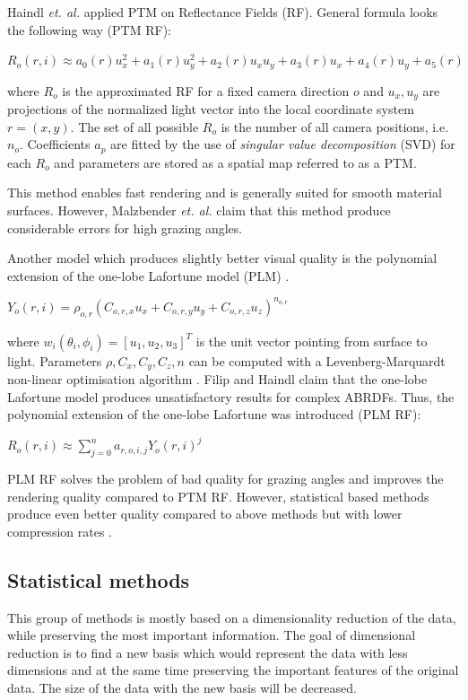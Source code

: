 Haindl  \emph{et. al.} \cite{haindl} applied PTM on Reflectance Fields (RF).
General formula looks the following way (PTM RF):

{\centering$R_{o}(r,i)\approx a_{0}(r)u_{x}^2+a_{1}(r)u_{y}^2+a_{2}(r)u_{x}u_{y}+a_{3}(r)u_{x}+a_{4}(r)u_{y}+a_{5}(r)$\\}

 where $R_{o}$ is the approximated RF for a fixed camera direction $o$ and $u_{x},u_{y}$ are projections of the normalized light vector into the local coordinate system $r=(x,y)$.
 The set of all possible $R_{o}$ is the number of all camera positions, i.e. $n_{o}$. 
 Coefficients $a_{p}$ are fitted by the use of \emph{singular value decomposition} (SVD) for each $R_{o}$ and parameters are stored as a spatial map referred to as a PTM.
 
  This method enables fast rendering and is generally suited for smooth material surfaces.
  However, Malzbender  \emph{et. al.} \cite{PTM} claim that this method produce considerable errors for high grazing angles. 

 
 Another model which produces slightly better visual quality is the polynomial extension of the one-lobe Lafortune model (PLM) \cite{haindl}.


{\centering$Y_{o} (r,i) = \rho_{o,r}(C_{o,r,x}u_{x}+C_{o,r,y}u_{y}+C_{o,r,z}u_{z})_{ }^{n_{o,r}}$\\}

where $w_{i}(\theta_{i}, \phi_{i})=[u_{1},u_{2},u_{3}]^{T}$ is the unit vector pointing from surface to light.
Parameters $\rho,C_{x},C_{y},C_{z},n$ can be computed with a Levenberg-Marquardt non-linear optimisation algorithm \cite{plm}. 
 Filip and Haindl \cite{plm} claim that the one-lobe Lafortune model produces unsatisfactory results for complex ABRDFs.
 Thus, the polynomial extension of the one-lobe Lafortune was introduced (PLM RF):

{\centering$R_{o}(r,i)\approx  \sum_{j=0}^{n} a_{r,o,i,j}Y_{o}(r,i)^j$\\}



PLM RF solves the problem of bad quality for grazing angles and improves the rendering quality compared to PTM RF.
However, statistical based methods produce even better quality compared to above methods but with lower compression rates \cite{haindl}.



  \subsection{Statistical methods}
\label{section:stat_methods}
This group of methods is mostly based on a dimensionality reduction of the data, while preserving the most important information.
The goal of dimensional reduction is to find a new basis which would represent the data with less dimensions and at the same time preserving the important features of the original data.
 The size of the data with the new basis will be decreased.

